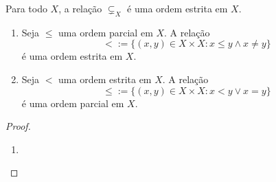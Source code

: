 \begin{example}
    Para todo $X$, a relação $\subsetneq_X$ é uma ordem estrita em $X$.
\end{example}

\begin{proposition} \label{prop.set:parcial_e_estrita}
    \leavevmode
        \begin{enumerate}[leftmargin=*, align=left, label=\textbf{(\alph*)}]
            \item Seja $\leq$ uma ordem parcial em $X$. A relação
                \[
                    {<} := \{(x,y) \in X \times X : x \leq y \land x \neq y \}
                \]
            é uma ordem estrita em $X$.
            \item Seja $<$ uma ordem estrita em $X$. A relação
                \[
                    {\leq} := \{(x,y) \in X \times X : x<y \lor x=y \}
                \]
            é uma ordem parcial em $X$.
        \end{enumerate}
\end{proposition}

\begin{proof}
    \leavevmode
        \begin{enumerate}[leftmargin=*, align=left, label=\textbf{(\alph*)}]
            \item 
        \end{enumerate}
\end{proof}

